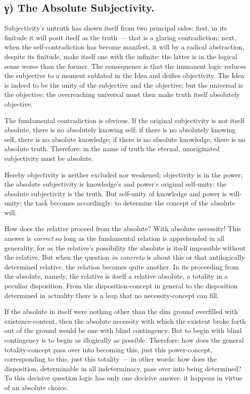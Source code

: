 \documentclass[12pt]{book}
\begin{document}
\subsection*{γ) The Absolute Subjectivity.}

Subjectivity's untruth has shown itself from two principal sides:
first, in its finitude it will posit itself as the truth --- that is
a glaring contradiction; next, when the self-contradiction has
become manifest, it will by a radical abstraction, despite its
finitude, make itself one with the infinite: the latter is in the
logical sense worse than the former. The consequence is that the
immanent logic reduces the subjective to a moment sublated in the
Idea and deifies objectivity. The Idea is indeed to be the unity of
the subjective and the objective; but the universal is the
objective: the overreaching universal must then make truth itself
absolutely objective.

The fundamental contradiction is obvious. If the original
subjectivity is not itself absolute, there is no absolutely knowing
self; if there is no absolutely knowing self, there is no absolute
knowledge; if there is no absolute knowledge, there is no absolute
truth. Therefore: in the name of truth the eternal, unoriginated
subjectivity must be absolute.

Hereby objectivity is neither excluded nor weakened; objectivity is
in the power; the absolute subjectivity is knowledge's and power's
original self-unity: the absolute
subjectivity is the truth. But self-unity of knowledge and power is
will-unity; the task becomes accordingly: to determine the concept
of the absolute will.

How does the relative proceed from the absolute? With absolute
necessity! This answer is \textit{correct} so long as the
fundamental relation is apprehended in all generality, for as the
relative's possibility the absolute is itself impossible without the
relative. But when the question \textit{in concreto} is about this
or that antilogically determined relative, the relation becomes
quite another. In its proceeding from the absolute, namely, the
relative is itself a relative absolute, a totality in a peculiar
disposition. From the disposition-concept in general to the
disposition determined in actuality there is a leap that no
necessity-concept can fill.

If the absolute in itself were nothing other than the dim ground
overfilled with existence-content, then the absolute necessity with
which the existent broke forth out of the ground would be one with
blind contingency. But to begin with blind contingency is to begin
as illogically as possible. Therefore: how does the general
totality-concept pass over into becoming this, just this
power-concept, corresponding to this, just this totality --- in
other words: how does the disposition, determinable in all
indeterminacy, pass over into being determined? To this decisive
question logic has only one decisive answer: it happens in virtue of
an absolute choice.
\end{document}
